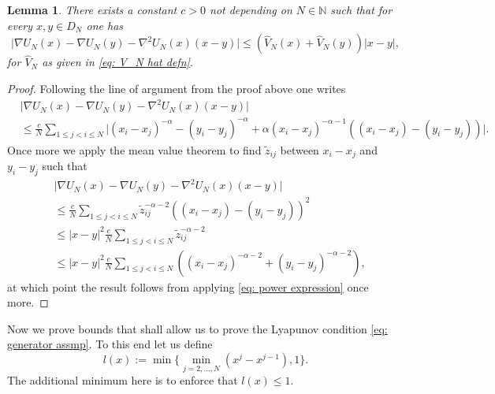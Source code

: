 \documentclass{article}
\newtheorem{lemma}{Lemma}
\begin{document}
\begin{lemma}\label{lem: lyapunov lipschitz interacting particles}
    There exists a constant $c>0$ not depending on $N\in \mathbb{N}$ such that for every $x,y \in D_N$ one has
    \begin{equation}
       \lvert \nabla U_N(x)-\nabla U_N(y)-\nabla^2 U_N(x)(x-y)\rvert\leq (\hat{V}_N(x)+\hat{V}_N(y))\lvert x-y\rvert,
   \end{equation}
   for $\hat{V}_N$ as given in \eqref{eq: V_N hat defn}. 
\end{lemma}
\begin{proof}
 Following the line of argument from the proof above one writes
   \begin{align}
       &\lvert \nabla U_N(x)-\nabla U_N(y)-\nabla^2 U_N(x)(x-y)\rvert\nonumber \\
       &\leq \frac{c}{N}\sum_{1\leq j<i\leq N}\lvert (x_i-x_j)^{-\alpha}-(y_i-y_j)^{-\alpha}+\alpha (x_i-x_j)^{-\alpha-1}((x_i-x_j)-(y_i-y_j))\rvert.\nonumber
   \end{align}
   Once more we apply the mean value theorem to find $\tilde{z}_{ij}$ between $x_i-x_j$ and $y_i-y_j$ such that 
     \begin{align}
       &\lvert \nabla U_N(x)-\nabla U_N(y)-\nabla^2 U_N(x)(x-y)\rvert\nonumber \\
       &\leq \frac{c}{N}\sum_{1\leq j<i\leq N}\tilde{z}_{ij}^{-\alpha-2}((x_i-x_j)-(y_i-y_j))^2\nonumber \\
       &\leq \lvert x-y\rvert^2\frac{c}{N}\sum_{1\leq j<i\leq N}\tilde{z}_{ij}^{-\alpha-2}\nonumber \\
       &\leq \lvert x-y\rvert^2\frac{c}{N}\sum_{1\leq j<i\leq N}((x_i-x_j)^{-\alpha-2}+(y_i-y_j)^{-\alpha-2}),
   \end{align}
   at which point the result follows from applying \eqref{eq: power expression} once more.
\end{proof}
Now we prove bounds that shall allow us to prove the Lyapunov condition \eqref{eq: generator assmp}. To this end let us define
\begin{equation}\label{eq: l defn}
        l(x):=\min\{\min_{j=2,...,N} ( x^j-x^{j-1}),1\}.
    \end{equation}
    The additional minimum here is to enforce that $l(x)\leq 1$.
\end{document}

